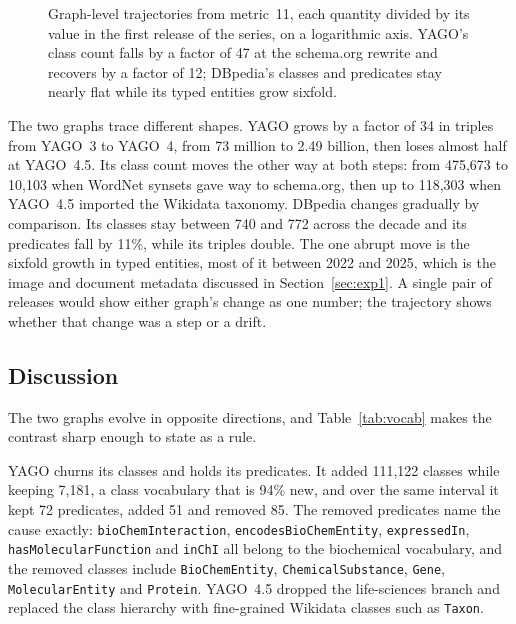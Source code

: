 \begin{figure}[htbp]
  \centering
  \hfill
  \caption[]{Graph-level
    trajectories from metric~11, each quantity divided by its value in the first
    release of the series, on a logarithmic axis. YAGO's class count falls by a
    factor of 47 at the schema.org rewrite and recovers by a factor of 12;
    DBpedia's classes and predicates stay nearly flat while its typed entities
    grow sixfold.}
  \label{fig:trajectories}
\end{figure}

The two graphs trace different shapes. YAGO grows by a factor of 34 in triples
from YAGO~3 to YAGO~4, from 73 million to 2.49 billion, then loses almost half
at YAGO~4.5. Its class count moves the other way at both steps: from 475{,}673 to
10{,}103 when WordNet synsets gave way to schema.org, then up to 118{,}303 when
YAGO~4.5 imported the Wikidata taxonomy. DBpedia changes gradually by comparison.
Its classes stay between 740 and 772 across the decade and its predicates fall
by 11\%, while its triples double. The one abrupt move is the sixfold growth in
typed entities, most of it between 2022 and 2025, which is the image and
document metadata discussed in Section~\ref{sec:exp1}. A single pair of releases
would show either graph's change as one number; the trajectory shows whether
that change was a step or a drift.

\subsection{Discussion}

The two graphs evolve in opposite directions, and Table~\ref{tab:vocab} makes the
contrast sharp enough to state as a rule.

YAGO churns its classes and holds its predicates. It added 111{,}122 classes
while keeping 7{,}181, a class vocabulary that is 94\% new, and over the same
interval it kept 72 predicates, added 51 and removed 85. The removed predicates
name the cause exactly: \texttt{bioChemInteraction},
\texttt{encodesBioChemEntity}, \texttt{expressedIn}, \texttt{hasMolecularFunction}
and \texttt{inChI} all belong to the biochemical vocabulary, and the removed
classes include \texttt{BioChemEntity}, \texttt{ChemicalSubstance},
\texttt{Gene}, \texttt{MolecularEntity} and \texttt{Protein}. YAGO~4.5 dropped
the life-sciences branch and replaced the class hierarchy with fine-grained
Wikidata classes such as \texttt{Taxon}.

